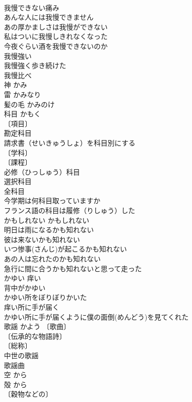\documentclass[8pt]{extreport}
\begin{document}
\begin{CJK}{UTF8}{min}
\\	我慢できない痛み 
\\	あんな人には我慢できません 
\\	あの厚かましさは我慢ができない 
\\	私はついに我慢しきれなくなった 
\\	今夜ぐらい酒を我慢できないのか 
\\	我慢強い 
\\	我慢強く歩き続けた 
\\	我慢比べ 
\\	神	かみ	
\\	雷	かみなり	
\\	髪の毛	かみのけ	
\\	科目	かもく	
\\	〔項目〕
\\	勘定科目 
\\	請求書（せいきゅうしょ）を科目別にする 
\\	〔学科〕
\\	〔課程〕
\\	必修（ひっしゅう）科目 
\\	選択科目 
\\	全科目 
\\	今学期は何科目取っていますか 
\\	フランス語の科目は履修（りしゅう）した 
\\	かもしれない	かもしれない	
\\	明日は雨になるかも知れない 
\\	彼は来ないかも知れない 
\\	いつ惨事(さんじ)が起こるかも知れない 
\\	あの人は忘れたのかも知れない 
\\	急行に間に合うかも知れないと思って走った 
\\	かゆい	痒い	
\\	背中がかゆい 
\\	かゆい所をぼりぼりかいた 
\\	痒い所に手が届く 
\\	かゆい所に手が届くように僕の面倒(めんどう)を見てくれた 
\\	歌謡	かよう	〔歌曲〕
\\	〔伝承的な物語詩〕
\\	〔総称〕
\\	中世の歌謡 
\\	歌謡曲 
\\	空	から	
\\	殻	から	
\\	〔穀物などの〕

\end{CJK}
\end{document}
